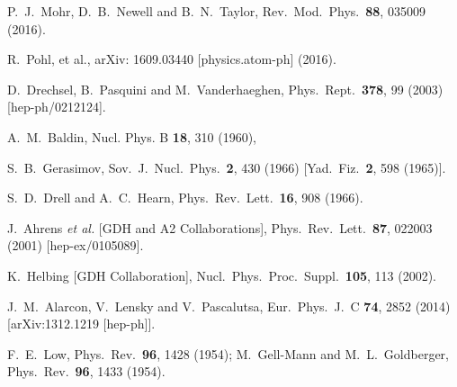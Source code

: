\documentclass[twocolumn,prc,showpacs,nofootinbib,preprintnumbers,amsmath,amssymb,superscriptaddress]{revtex4-1}
\begin{document}
\begin{thebibliography}{99}
P.~J.~Mohr, D.~B.~Newell and B.~N.~Taylor, Rev.\ Mod.\ Phys.\ {\bf 88}, 035009 (2016).
  
R.~Pohl, et al., arXiv: 1609.03440 [physics.atom-ph] (2016).

  
  D.~Drechsel, B.~Pasquini and M.~Vanderhaeghen,
  Phys.\ Rept.\  {\bf 378}, 99 (2003)
  [hep-ph/0212124].
  
  A.~M.~Baldin, Nucl. Phys. B {\bf 18}, 310 (1960),
  
  S.~B.~Gerasimov,
  Sov.\ J.\ Nucl.\ Phys.\  {\bf 2}, 430 (1966)
  [Yad.\ Fiz.\  {\bf 2}, 598 (1965)].
  
  S.~D.~Drell and A.~C.~Hearn,
  Phys.\ Rev.\ Lett.\  {\bf 16}, 908 (1966).
  
 
  J.~Ahrens {\it et al.}  [GDH and A2 Collaborations],
  Phys.\ Rev.\ Lett.\  {\bf 87}, 022003 (2001)
  [hep-ex/0105089].
  
  K.~Helbing [GDH Collaboration],
  Nucl.\ Phys.\ Proc.\ Suppl.\  {\bf 105}, 113 (2002).
  
  J.~M.~Alarcon, V.~Lensky and V.~Pascalutsa,
  Eur.\ Phys.\ J.\ C {\bf 74}, 2852 (2014)
  [arXiv:1312.1219 [hep-ph]].
  
F.~E.~Low,
  Phys.\ Rev.\  {\bf 96}, 1428 (1954); 
  M.~Gell-Mann and M.~L.~Goldberger,
  Phys.\ Rev.\  {\bf 96}, 1433 (1954).
  

\end{thebibliography}
\end{document}
